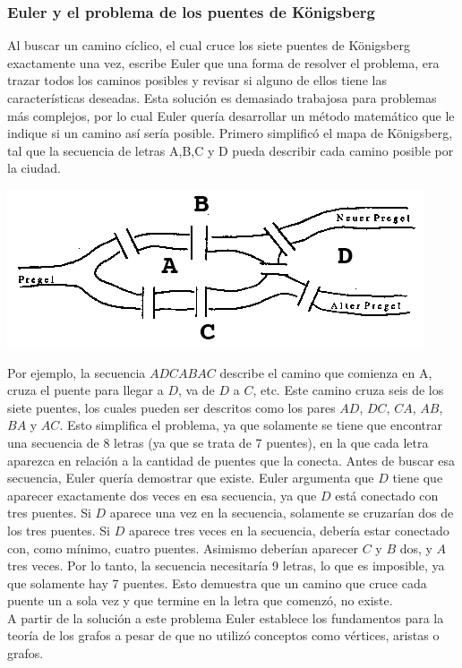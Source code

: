 \documentclass[12pt]{article}
\begin{document}
\subsubsection{Euler y el problema de los puentes de K\"{o}nigsberg}
Al buscar un camino cíclico, el cual cruce los siete puentes de K\"{o}nigsberg exactamente una vez, escribe Euler que una forma de resolver el problema, era trazar todos los caminos posibles y revisar si alguno de ellos tiene las características deseadas. Esta solución es demasiado trabajosa para problemas más complejos, por lo cual Euler quería desarrollar un método matemático que le indique si un camino así sería posible. Primero simplificó el mapa de K\"{o}nigsberg, tal que la secuencia de letras A,B,C y D pueda describir cada camino posible por la ciudad.
\begin{center}
\includegraphics[scale=0.7]{pregelbruecken.png}
\end{center}
Por ejemplo, la secuencia $ADCABAC$ describe el camino que comienza en A, cruza el puente para llegar a $D$, va de $D$ a $C$, etc. Este camino cruza seis de los siete puentes, los cuales pueden ser descritos como los pares $AD$, $DC$, $CA$, $AB$, $BA$ y $AC$. Esto simplifica el problema, ya que solamente se tiene que encontrar una secuencia de 8 letras (ya que se trata de 7 puentes), en la que cada letra aparezca en relación a la cantidad de puentes que la conecta. Antes de buscar esa secuencia, Euler quería demostrar que existe. Euler argumenta que $D$ tiene que aparecer exactamente dos veces en esa secuencia, ya que $D$ está conectado con tres puentes. Si $D$ aparece una vez en la secuencia, solamente se cruzarían dos de los tres puentes. Si $D$ aparece tres veces en la secuencia, debería estar conectado con, como mínimo, cuatro puentes. Asimismo deberían aparecer $C$ y $B$ dos, y $A$ tres veces. Por lo tanto, la secuencia necesitaría 9 letras, lo que es imposible, ya que solamente hay 7 puentes. Esto demuestra que un camino que cruce cada puente un a sola vez y que termine en la letra que comenzó, no existe. 
\\A partir de la solución a este problema Euler establece los fundamentos para la teoría de los grafos a pesar de que no utilizó conceptos como vértices, aristas o grafos.
\end{document}
